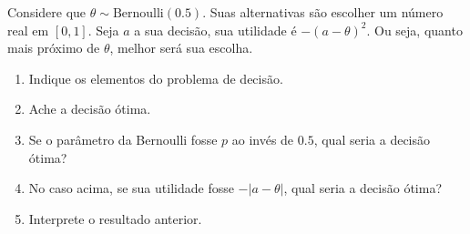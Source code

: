 \begin{exercise}
 Considere que $\theta \sim \text{Bernoulli}(0.5)$.
 Suas alternativas são escolher um número real em $[0,1]$.
 Seja $a$ a sua decisão, sua utilidade é
 $-(a-\theta)^{2}$. Ou seja, quanto mais próximo de
 $\theta$, melhor será sua escolha.
 \begin{enumerate}[label=(\alph*)]
  \item Indique os elementos do problema de decisão.
  \item Ache a decisão ótima.
  \item Se o parâmetro da Bernoulli fosse $p$ ao
  invés de $0.5$, qual seria a decisão ótima?
  \item No caso acima,
  se sua utilidade fosse $-|a-\theta|$,
  qual seria a decisão ótima?
  \item Interprete o resultado anterior.
 \end{enumerate}
\end{exercise}

